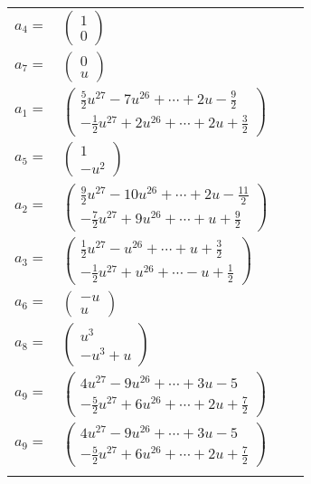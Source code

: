 \documentclass[1p]{elsarticle_modified}
\theoremstyle{definition}
\begin{document}
\begin{tabular}{m{7pt} m{180pt} m{7pt} m{180pt} }
\flushright $a_{4}=$&$\begin{pmatrix}1\\0\end{pmatrix}$ \\
\flushright $a_{7}=$&$\begin{pmatrix}0\\u\end{pmatrix}$ \\
\flushright $a_{1}=$&$\begin{pmatrix}\frac{5}{2} u^{27}-7 u^{26}+\cdots+2 u-\frac{9}{2}\\-\frac{1}{2} u^{27}+2 u^{26}+\cdots+2 u+\frac{3}{2}\end{pmatrix}$ \\
\flushright $a_{5}=$&$\begin{pmatrix}1\\- u^2\end{pmatrix}$ \\
\flushright $a_{2}=$&$\begin{pmatrix}\frac{9}{2} u^{27}-10 u^{26}+\cdots+2 u-\frac{11}{2}\\-\frac{7}{2} u^{27}+9 u^{26}+\cdots+u+\frac{9}{2}\end{pmatrix}$ \\
\flushright $a_{3}=$&$\begin{pmatrix}\frac{1}{2} u^{27}- u^{26}+\cdots+u+\frac{3}{2}\\-\frac{1}{2} u^{27}+u^{26}+\cdots- u+\frac{1}{2}\end{pmatrix}$ \\
\flushright $a_{6}=$&$\begin{pmatrix}- u\\u\end{pmatrix}$ \\
\flushright $a_{8}=$&$\begin{pmatrix}u^3\\- u^3+u\end{pmatrix}$ \\
\flushright $a_{9}=$&$\begin{pmatrix}4 u^{27}-9 u^{26}+\cdots+3 u-5\\-\frac{5}{2} u^{27}+6 u^{26}+\cdots+2 u+\frac{7}{2}\end{pmatrix}$\\ \flushright $a_{9}=$&$\begin{pmatrix}4 u^{27}-9 u^{26}+\cdots+3 u-5\\-\frac{5}{2} u^{27}+6 u^{26}+\cdots+2 u+\frac{7}{2}\end{pmatrix}$\\&\end{tabular}
\end{document}
